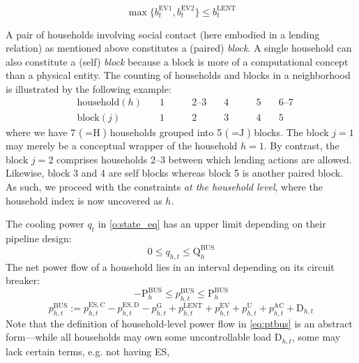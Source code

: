 \documentclass[journal]{IEEEtran}
\begin{document}
\begin{equation}\label{lent_logic}
    \max \{ b_t^\mathrm{EV1}, b_t^\mathrm{EV2} \} \le b_t^\mathrm{LENT}
\end{equation}
\par
A pair of households involving social contact (here embodied in
a lending relation) as mentioned above constitutes
a (paired) \textit{block}.
A single household can also constitute a (self) \textit{block} because
a block is more of a computational concept than a physical entity.
The counting of households and blocks in a neighborhood is illustrated by the following example:
\begin{align*}
    &\text{household}(h) \quad &1 \qquad &2\text{--}3 \quad  &4 \qquad &5 \quad &6\text{--}7 \\
    &\text{block}(j) \quad &1 \qquad &2 \quad  &3 \qquad &4 \quad &5 \quad
\end{align*}
where we have 7 ($=\!\textrm{H}$) households grouped into 5 ($=\!\textrm{J}$) blocks.
The block $j\!=\!1$ may merely be a conceptual wrapper of the household $h\!=\!1$.
By contrast, the block $j\!=\!2$ comprises households 2--3 between which lending actions are allowed.
Likewise, block 3 and 4 are self blocks whereas block 5 is another paired block.
As such, we proceed with the constraints \textit{at the household level},
where the household index is now uncovered as $h$.
\par
The cooling power $q_t$ in \eqref{o:state_eq} has an upper limit
depending on their pipeline design:
\begin{equation}\label{q:bus}
    0 \le q_{h, t} \le \mathrm{Q}_h^\mathrm{BUS}
\end{equation}
The net power flow of a household lies in an interval depending on its
circuit breaker:
\begin{equation}\label{eqnetflowinterval}
    -\mathrm{P}_h^\mathrm{BUS} \le p_{h, t}^\mathrm{BUS} \le \mathrm{P}_h^\mathrm{BUS}
\end{equation}
\begin{equation}\label{eq:ptbus}
    p_{h, t}^\mathrm{BUS} := p^\mathrm{ES, C}_{h, t} - p^\mathrm{ES, D}_{h, t} - p_{h, t}^\mathrm{G}
    + p_{h, t}^\mathrm{LENT} + p_{h, t}^\mathrm{EV} + p_{h, t}^\mathrm{U} + p_{h, t}^\mathrm{AC}
    + \mathrm{D}_{h, t}
\end{equation}
Note that the definition of household-level power flow in \eqref{eq:ptbus}
is an abstract form---while all households may own some uncontrollable
load $\mathrm{D}_{h, t}$, some may lack certain terms, e.g. not having ES, 
\end{document}

